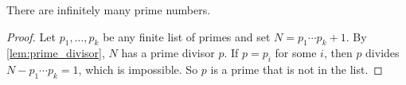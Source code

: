 \begin{theorem}[Euclid]\label{thm:euclid_infinitude}
    There are infinitely many prime numbers.
\end{theorem}
\begin{proof}
    Let $p_1, \dots, p_k$ be any finite list of primes and set $N = p_1 \cdots p_k + 1$. By \cref{lem:prime_divisor}, $N$ has a prime divisor $p$. If $p = p_i$ for some $i$, then $p$ divides $N - p_1 \cdots p_k = 1$, which is impossible. So $p$ is a prime that is not in the list.
\end{proof}
